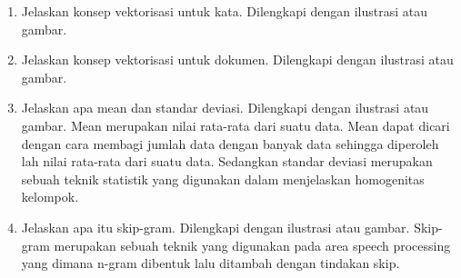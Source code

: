 \begin{enumerate}
\item Jelaskan konsep vektorisasi untuk kata. Dilengkapi dengan ilustrasi atau gambar.

\item Jelaskan konsep vektorisasi untuk dokumen. Dilengkapi dengan ilustrasi atau gambar.

\item Jelaskan apa mean dan standar deviasi. Dilengkapi dengan ilustrasi atau gambar.
	\subitem Mean merupakan nilai rata-rata dari suatu data. Mean dapat dicari dengan cara membagi jumlah data dengan banyak data sehingga diperoleh lah nilai rata-rata dari suatu data. Sedangkan standar deviasi merupakan sebuah teknik statistik yang digunakan dalam menjelaskan homogenitas kelompok.

\item Jelaskan apa itu skip-gram. Dilengkapi dengan ilustrasi atau gambar.
	\subitem Skip-gram merupakan sebuah teknik yang digunakan pada area speech processing yang dimana n-gram dibentuk lalu ditambah dengan tindakan skip.

\end{enumerate}